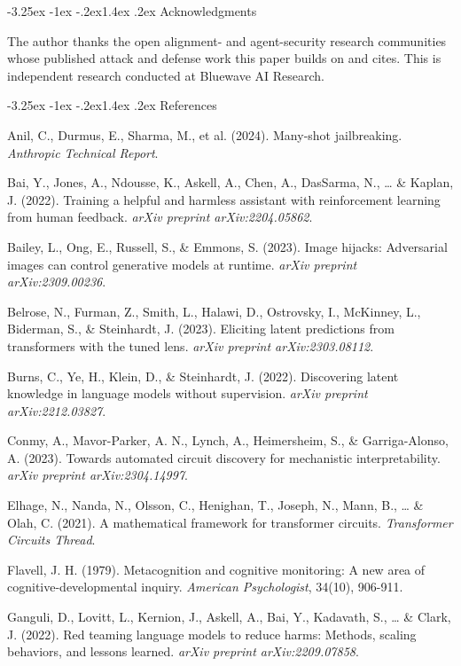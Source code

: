 \documentclass[
  11pt,
]{article}
\makeatletter
\renewcommand\section{\@startsection{section}{1}{\z@}%
  {-3.25ex \@plus -1ex \@minus -.2ex}{1.4ex \@plus.2ex}%
  {\normalfont\sffamily\Large\bfseries}}
\makeatother
\begin{document}
\section{Acknowledgments}\label{acknowledgments}

The author thanks the open alignment- and agent-security research
communities whose published attack and defense work this paper builds on
and cites. This is independent research conducted at Bluewave AI Research.

\section{References}\label{references}

Anil, C., Durmus, E., Sharma, M., et al. (2024). Many-shot jailbreaking.
\emph{Anthropic Technical Report}.

Bai, Y., Jones, A., Ndousse, K., Askell, A., Chen, A., DasSarma, N.,
\ldots{} \& Kaplan, J. (2022). Training a helpful and harmless assistant
with reinforcement learning from human feedback. \emph{arXiv preprint
arXiv:2204.05862}.

Bailey, L., Ong, E., Russell, S., \& Emmons, S. (2023). Image hijacks:
Adversarial images can control generative models at runtime. \emph{arXiv
preprint arXiv:2309.00236}.

Belrose, N., Furman, Z., Smith, L., Halawi, D., Ostrovsky, I., McKinney,
L., Biderman, S., \& Steinhardt, J. (2023). Eliciting latent predictions
from transformers with the tuned lens. \emph{arXiv preprint
arXiv:2303.08112}.

Burns, C., Ye, H., Klein, D., \& Steinhardt, J. (2022). Discovering
latent knowledge in language models without supervision. \emph{arXiv
preprint arXiv:2212.03827}.

Conmy, A., Mavor-Parker, A. N., Lynch, A., Heimersheim, S., \&
Garriga-Alonso, A. (2023). Towards automated circuit discovery for
mechanistic interpretability. \emph{arXiv preprint arXiv:2304.14997}.

Elhage, N., Nanda, N., Olsson, C., Henighan, T., Joseph, N., Mann, B.,
\ldots{} \& Olah, C. (2021). A mathematical framework for transformer
circuits. \emph{Transformer Circuits Thread}.

Flavell, J. H. (1979). Metacognition and cognitive monitoring: A new
area of cognitive-developmental inquiry. \emph{American Psychologist},
34(10), 906-911.

Ganguli, D., Lovitt, L., Kernion, J., Askell, A., Bai, Y., Kadavath, S.,
\ldots{} \& Clark, J. (2022). Red teaming language models to reduce
harms: Methods, scaling behaviors, and lessons learned. \emph{arXiv
preprint arXiv:2209.07858}.
\end{document}
